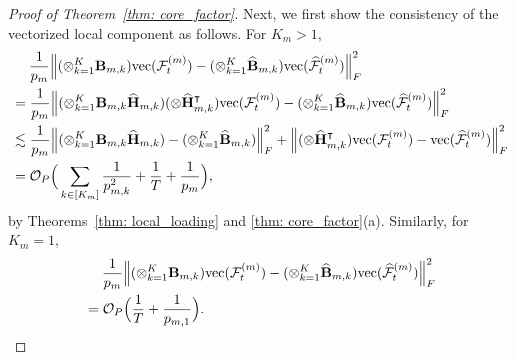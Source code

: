 \documentclass[aos]{imsart}
\theoremstyle{plain}
\theoremstyle{definition}
\def\wh#1{\widehat{#1}}
\def\cF{\mathcal{F}}
\def\cO{\mathcal{O}}
\def\bB{\mathbf{B}}
\def\bH{\mathbf{H}}
\def\trans{\intercal}
\def\vec{\mathrm{vec}}
\begin{document}
\begin{proof}[Proof of Theorem~\ref{thm: core_factor}]
Next, we first show the consistency of the vectorized local component as follows. For $K_m> 1$,
\begin{align}
    &\;\quad
    \frac{1}{p_m} \Big\| (\otimes_{k=1}^K \bB_{m,k}) \vec(\cF_t^{(m)}) - (\otimes_{k=1}^K \wh{\bB}_{m,k}) \vec(\wh\cF_t^{(m)}) \Big\|_F^2 \notag \\
    &=
    \frac{1}{p_m} \Big\| (\otimes_{k=1}^K \bB_{m,k} \wh{\bH}_{m,k}) (\otimes \wh{\bH}_{m,k}^\trans) \vec(\cF_t^{(m)}) - (\otimes_{k=1}^K \wh{\bB}_{m,k}) \vec(\wh\cF_t^{(m)}) \Big\|_F^2 \notag \\
    &\lesssim
    \frac{1}{p_m} \Big\| (\otimes_{k=1}^K \bB_{m,k} \wh{\bH}_{m,k}) - (\otimes_{k=1}^K \wh{\bB}_{m,k}) \Big\|_F^2
    + \Big\| (\otimes \wh{\bH}_{m,k}^\trans) \vec(\cF_t^{(m)}) - \vec(\wh\cF_t^{(m)}) \Big\|_F^2 \notag \\
    &=
    \cO_P\Big( \sum_{k\in[K_m]} \frac{1}{p_{m,k}^2} + \frac{1}{T} + \frac{1}{p_m} \Big) ,
    \label{eqn: rate_local_component_Km_not1}
\end{align}
by Theorems~\ref{thm: local_loading} and \ref{thm: core_factor}(a). Similarly, for $K_m=1$,
\begin{align}
    &\;\quad
    \frac{1}{p_m} \Big\| (\otimes_{k=1}^K \bB_{m,k}) \vec(\cF_t^{(m)}) - (\otimes_{k=1}^K \wh{\bB}_{m,k}) \vec(\wh\cF_t^{(m)}) \Big\|_F^2 \notag \\
    &=
    \cO_P\Big( \frac{1}{T} + \frac{1}{p_{m,1}} \Big) .
    \label{eqn: rate_local_component_Km_1}
\end{align}



\end{proof}
\end{document}
